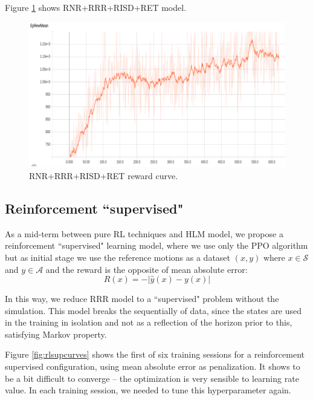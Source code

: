 Figure \ref{fig:finalpurereward} shows RNR+RRR+RISD+RET model. 

\begin{figure}[!htbp]
	\centering
	\includegraphics[width=1.0\textwidth]{Cap6/finalpurereward}
	\caption{RNR+RRR+RISD+RET reward curve.}
	\label{fig:finalpurereward}
\end{figure}

\subsection{Reinforcement ``supervised"}\label{sec:suprl}

As a mid-term between pure RL techniques and HLM model, we propose a reinforcement ``supervised" learning model, where we use only the PPO algorithm but as initial stage we use the reference motions as a dataset $(x, y)$ where $x \in \mathcal{S}$ and $y \in \mathcal{A}$ and the reward is the opposite of mean absolute error:
\begin{equation}
R(x) = - \lvert \hat y(x) - y(x) \rvert 
\end{equation}

 In this way, we reduce RRR model to a ``supervised" problem without the simulation. This model breaks the sequentially of data, since the states are used in the training in isolation and not as a reflection of the horizon prior to this, satisfying Markov property.

Figure \ref{fig:rlsupcurves} shows the first of six training sessions for a reinforcement supervised configuration, using mean absolute error as penalization. It shows to be a bit difficult to converge -- the optimization is very sensible to learning rate value. In each training session, we needed to tune this hyperparameter again.

